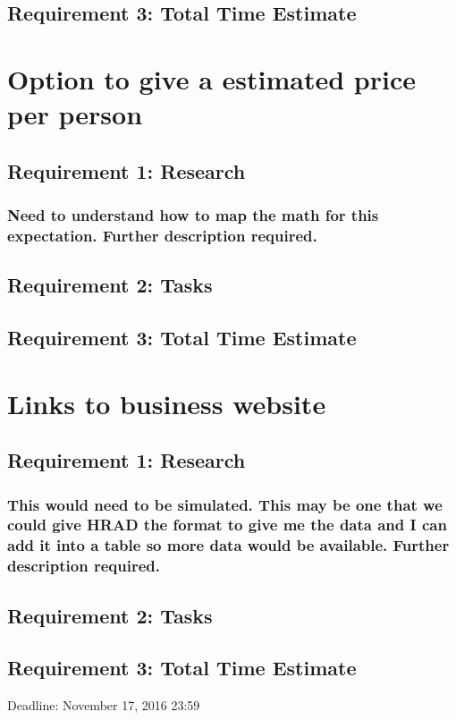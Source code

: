 \documentclass [10pt] {article}
\begin{document}
\subsection{Requirement 3: Total Time Estimate}


\section{Option to give a estimated price per person}
\subsection{Requirement 1: Research}
\subsubsection{Need to understand how to map the math for this expectation. Further description required.}
\subsection{Requirement 2: Tasks}
\subsection{Requirement 3: Total Time Estimate}


\section{Links to business website}
\subsection{Requirement 1: Research}
\subsubsection{This would need to be simulated.  This may be one that we could give HRAD the format to give me the data and I can add it into a table so more data would be available.  Further description required.}
\subsection{Requirement 2: Tasks}
\subsection{Requirement 3: Total Time Estimate}




Deadline: November 17, 2016 23:59
\end{document}
